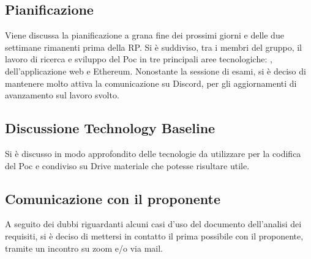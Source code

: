 \subsection*{Pianificazione}
Viene discussa la pianificazione a grana fine dei prossimi giorni e delle due settimane rimanenti prima della RP. Si è suddiviso, tra i membri del gruppo, il lavoro di ricerca e sviluppo del Poc in tre principali aree tecnologiche: ,  dell'applicazione web e Ethereum. 
Nonostante la sessione di esami, si è deciso di mantenere molto attiva la comunicazione su Discord, per gli aggiornamenti di avanzamento sul lavoro svolto.

\subsection*{Discussione Technology Baseline}
Si è discusso in modo approfondito delle tecnologie da utilizzare per la codifica del Poc e condiviso su Drive materiale che potesse risultare utile.

\subsection*{Comunicazione con il proponente}
A seguito dei dubbi riguardanti alcuni casi d'uso del documento dell'analisi dei requisiti, si è deciso di mettersi in contatto il prima possibile con il proponente, tramite un incontro su zoom e/o via mail.